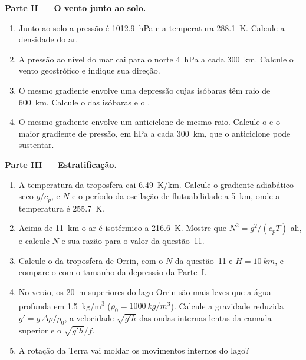 \begin{problem}
\medskip\noindent\textbf{Parte II --- O vento junto ao solo.}
\begin{enumerate}[resume]
\item Junto ao solo a pressão é \qty{1012.9}{hPa} e a temperatura
  \qty{288.1}{K}. Calcule a densidade do ar.
\item A pressão ao nível do mar cai para o norte \qty{4}{hPa} a cada
  \qty{300}{km}. Calcule o vento geostrófico e indique sua direção.
\item O mesmo gradiente envolve uma depressão cujas isóbaras têm raio
  de \qty{600}{km}. Calcule o  das isóbaras e o
  .
\item O mesmo gradiente envolve um anticiclone de mesmo raio.
  Calcule o  e o maior gradiente de pressão, em
  \unit{hPa} a cada \qty{300}{km}, que o anticiclone pode sustentar.
\end{enumerate}

\medskip\noindent\textbf{Parte III --- Estratificação.}
\begin{enumerate}[resume]
\item A temperatura da troposfera cai \qty{6.49}{K/km}.
  Calcule o gradiente adiabático seco $g/c_p$, e $N$ e o período da
  oscilação de flutuabilidade a \qty{5}{km}, onde a temperatura é
  \qty{255.7}{K}.
\item Acima de \qty{11}{km} o ar é isotérmico a \qty{216.6}{K}. Mostre que
  $N^2 = g^2/(c_pT)$ ali, e calcule $N$ e sua razão para o valor da
  questão~11.
\item Calcule o  da troposfera de Orrin, com o $N$ da
  questão~11 e $H = \qty{10}{km}$, e compare-o com o tamanho da
  depressão da Parte~I.
\item No verão, os \qty{20}{m} superiores do lago Orrin são mais leves que a
  água profunda em \qty{1.5}{kg/m^3} ($\rho_0 = \qty{1000}{kg/m^3}$). Calcule
  a gravidade reduzida $g' = g\,\Delta\rho/\rho_0$, a velocidade $\sqrt{g'h}$ das
  ondas internas lentas da camada superior e o 
  $\sqrt{g'h}/f$.
\item A rotação da Terra vai moldar os movimentos internos do lago?
\end{enumerate}


\end{problem}
